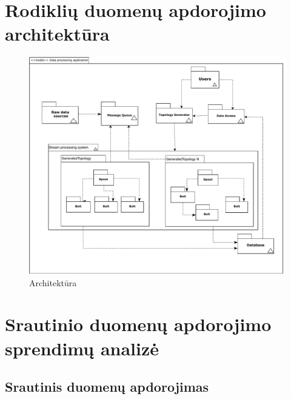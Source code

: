 \documentclass{VUMIFPSbakalaurinis}
\begin{document}
\section{Rodiklių duomenų apdorojimo architektūra}

\begin{figure}[H]
    \centering
    \includegraphics[width=1\textwidth]{img/architekturos_diagrama.pdf}
    \caption{Architektūra}
    \label{img:architektura}
\end{figure}

\section{Srautinio duomenų apdorojimo sprendimų analizė}

\subsection{Srautinis duomenų apdorojimas} \label{strprocess}
\end{document}

